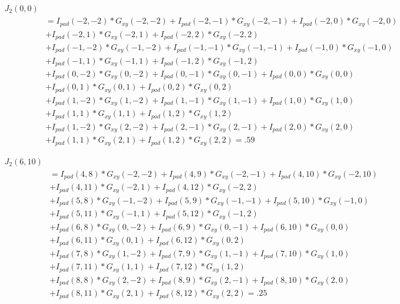 \documentclass[11pt,english]{article}
\begin{document}
\begin{align*}
J_2(0,0) \\
&= I_{pad}(-2,-2)*G_{xy}(-2,-2) + I_{pad}(-2,-1)*G_{xy}(-2,-1) + I_{pad}(-2,0)*G_{xy}(-2,0) \\
 &+ I_{pad}(-2,1)*G_{xy}(-2,1) +  I_{pad}(-2,2)*G_{xy}(-2,2) \\
&+I_{pad}(-1,-2)*G_{xy}(-1,-2) + I_{pad}(-1,-1)*G_{xy}(-1,-1) + I_{pad}(-1,0)*G_{xy}(-1,0)\\
&+ I_{pad}(-1,1)*G_{xy}(-1,1)+  I_{pad}(-1,2)*G_{xy}(-1,2) \\
&+I_{pad}(0,-2)*G_{xy}(0,-2) + I_{pad}(0,-1)*G_{xy}(0,-1) + I_{pad}(0,0)*G_{xy}(0,0) \\ 
& +I_{pad}(0,1)*G_{xy}(0,1) + I_{pad}(0,2)*G_{xy}(0,2) \\
&+ I_{pad}(1,-2)*G_{xy}(1,-2) + I_{pad}(1,-1)*G_{xy}(1,-1) + I_{pad}(1,0)*G_{xy}(1,0)\\
&+ I_{pad}(1,1)*G_{xy}(1,1) + I_{pad}(1,2)*G_{xy}(1,2) \\
&+I_{pad}(1,-2)*G_{xy}(2,-2) + I_{pad}(2,-1)*G_{xy}(2,-1) + I_{pad}(2,0)*G_{xy}(2,0) \\
&+ I_{pad}(1,1)*G_{xy}(2,1) + I_{pad}(1,2)*G_{xy}(2,2) = .59
\end{align*}

\begin{align*}
J_2(6,10) \\
&= I_{pad}(4,8)*G_{xy}(-2,-2) + I_{pad}(4,9)*G_{xy}(-2,-1) + I_{pad}(4,10)*G_{xy}(-2,10) \\
&+ I_{pad}(4,11)*G_{xy}(-2,1) +  I_{pad}(4,12)*G_{xy}(-2,2)  \\
&+ I_{pad}(5,8)*G_{xy}(-1,-2) + I_{pad}(5,9)*G_{xy}(-1,-1) + I_{pad}(5,10)*G_{xy}(-1,0)\\
&+ I_{pad}(5,11)*G_{xy}(-1,1)+  I_{pad}(5,12)*G_{xy}(-1,2)\\
&+ I_{pad}(6,8)*G_{xy}(0,-2) + I_{pad}(6,9)*G_{xy}(0,-1) + I_{pad}(6,10)*G_{xy}(0,0)\\
&+ I_{pad}(6,11)*G_{xy}(0,1) + I_{pad}(6,12)*G_{xy}(0,2) \\
&+ I_{pad}(7,8)*G_{xy}(1,-2) + I_{pad}(7,9)*G_{xy}(1,-1) + I_{pad}(7,10)*G_{xy}(1,0)\\
&+ I_{pad}(7,11)*G_{xy}(1,1) + I_{pad}(7,12)*G_{xy}(1,2) \\
&+ I_{pad}(8,8)*G_{xy}(2,-2) + I_{pad}(8,9)*G_{xy}(2,-1) + I_{pad}(8,10)*G_{xy}(2,0)  \\
&+ I_{pad}(8,11)*G_{xy}(2,1) + I_{pad}(8,12)*G_{xy}(2,2) = .25
\end{align*}
\end{document}
